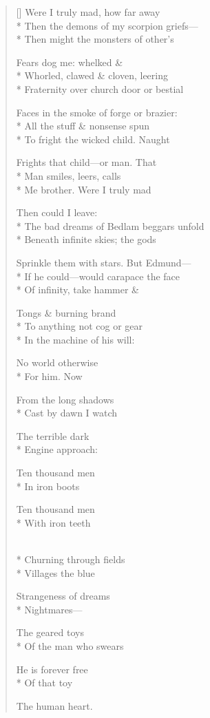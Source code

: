 \label{ch:lear_ap}
\settowidth{\versewidth}{Sprinkle them with stars.   But Edmund---}
\begin{verse}[\versewidth]
Were I truly mad, how far away\\*
Then the demons of my scorpion griefs---\\*
Then might the monsters of other's

Fears dog me: whelked \&\\*
Whorled, clawed \& cloven, leering\\*
Fraternity over church door or bestial

Faces in the smoke of forge or brazier:\\*
All the stuff \& nonsense spun\\*
To fright the wicked child.   Naught

Frights that child---or man.   That\\*
Man smiles, leers, calls\\*
Me brother.     Were I truly mad

Then could I leave:\\*
The bad dreams of Bedlam beggars unfold\\*
Beneath infinite skies; the gods

Sprinkle them with stars.   But Edmund---\\*
If he could---would carapace the face\\*
Of infinity, take hammer \&

Tongs \& burning brand\\*
To anything not cog or gear\\*
In the machine of his will:

No world otherwise\\*
For him.\hspace*{3\vgap} Now

From the long shadows\\*
Cast by dawn I watch

The terrible dark\\*
Engine approach:

Ten thousand men\\*
In iron boots

Ten thousand men\\*
With iron teeth

\\*
Churning through fields\\*
Villages\hspace*{3\vgap} the blue

Strangeness of dreams\\*
Nightmares---

The geared toys\\*
Of the man who swears

He is forever free\\*
Of that toy

The human heart.
\end{verse}
